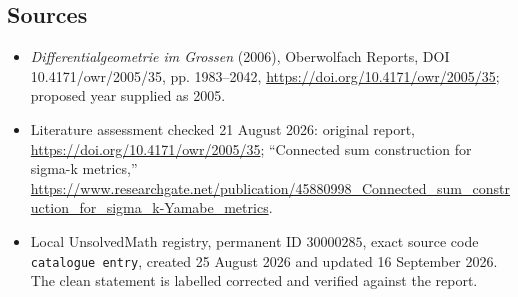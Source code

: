 \documentclass[11pt]{article}
\begin{document}
\subsection{Sources}
\begin{itemize}
\item \emph{Differentialgeometrie im Grossen} (2006), Oberwolfach Reports, DOI 10.4171/owr/2005/35, pp. 1983--2042, \url{https://doi.org/10.4171/owr/2005/35}; proposed year supplied as 2005.
\item Literature assessment checked 21 August 2026: original report, \url{https://doi.org/10.4171/owr/2005/35}; ``Connected sum construction for sigma-k metrics,'' \url{https://www.researchgate.net/publication/45880998_Connected_sum_construction_for_sigma_k-Yamabe_metrics}.
\item Local UnsolvedMath registry, permanent ID $30000285$, exact source code \texttt{catalogue entry}, created 25 August 2026 and updated 16 September 2026. The clean statement is labelled corrected and verified against the report.
\end{itemize}
\end{document}
